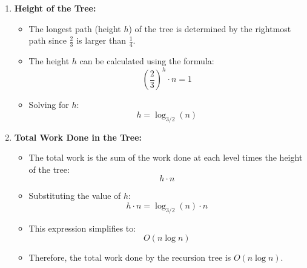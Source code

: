 \begin{example}
\begin{enumerate}
            \item \textbf{Height of the Tree:}
            \begin{itemize}
                \item The longest path (height \( h \)) of the tree is determined by the rightmost path since \( \frac{2}{3} \) is larger than \( \frac{1}{4} \).
                \item The height \( h \) can be calculated using the formula:
                \[
                \left(\frac{2}{3}\right)^h \cdot n = 1
                \]
                \item Solving for \( h \):
                \[
                h = \log_{3/2}(n)
                \]
            \end{itemize}
            
            \item \textbf{Total Work Done in the Tree:}
            \begin{itemize}
                \item The total work is the sum of the work done at each level times the height of the tree:
                \[
                h \cdot n
                \]
                \item Substituting the value of \( h \):
                \[
                h \cdot n = \log_{3/2}(n) \cdot n
                \]
                \item This expression simplifies to:
                \[
                O(n \log n)
                \]
                \item Therefore, the total work done by the recursion tree is \( O(n \log n) \).
            \end{itemize}
        \end{enumerate}
    \end{example}
